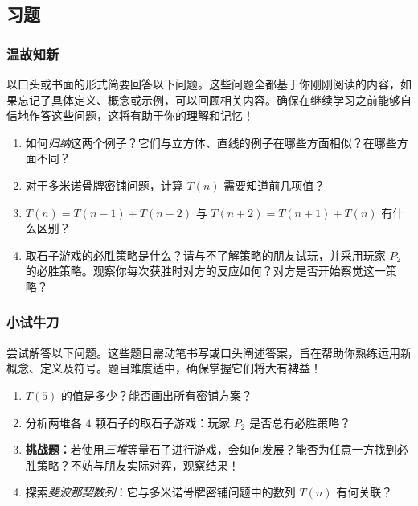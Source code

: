 \subsection{习题}

\subsubsection*{温故知新}

以口头或书面的形式简要回答以下问题。这些问题全都基于你刚刚阅读的内容，如果忘记了具体定义、概念或示例，可以回顾相关内容。确保在继续学习之前能够自信地作答这些问题，这将有助于你的理解和记忆！

\begin{enumerate}[label=(\arabic*)]
    \item 如何\emph{归纳}这两个例子？它们与立方体、直线的例子在哪些方面相似？在哪些方面不同？
    \item 对于多米诺骨牌密铺问题，计算 $T(n)$ 需要知道前几项值？
    \item $T(n) = T(n - 1) + T(n - 2)$ 与 $T(n + 2) = T(n + 1) + T(n)$ 有什么区别？
    \item 取石子游戏的必胜策略是什么？请与不了解策略的朋友试玩，并采用玩家 $P_2$ 的必胜策略。观察你每次获胜时对方的反应如何？对方是否开始察觉这一策略？
\end{enumerate}

\subsubsection*{小试牛刀}

尝试解答以下问题。这些题目需动笔书写或口头阐述答案，旨在帮助你熟练运用新概念、定义及符号。题目难度适中，确保掌握它们将大有裨益！

\begin{enumerate}[label=(\arabic*)]
    \item $T(5)$ 的值是多少？能否画出所有密铺方案？
    \item 分析两堆各 $4$ 颗石子的取石子游戏：玩家 $P_2$ 是否总有必胜策略？
    \item \textbf{挑战题：}若使用\emph{三堆}等量石子进行游戏，会如何发展？能否为任意一方找到必胜策略？不妨与朋友实际对弈，观察结果！
    \item 探索\emph{斐波那契数列}：它与多米诺骨牌密铺问题中的数列 $T(n)$ 有何关联？
\end{enumerate}